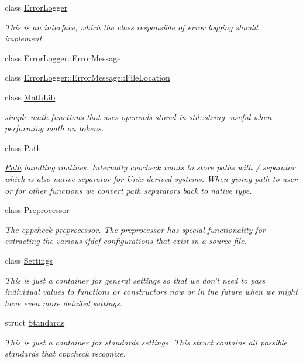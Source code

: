 \begin{DoxyCompactItemize}
class \hyperlink{class_error_logger}{Error\-Logger}
\begin{DoxyCompactList}\small\item\em This is an interface, which the class responsible of error logging should implement. \end{DoxyCompactList}\item 
class \hyperlink{class_error_logger_1_1_error_message}{Error\-Logger\-::\-Error\-Message}
\item 
class \hyperlink{class_error_logger_1_1_error_message_1_1_file_location}{Error\-Logger\-::\-Error\-Message\-::\-File\-Location}
\item 
class \hyperlink{class_math_lib}{Math\-Lib}
\begin{DoxyCompactList}\small\item\em simple math functions that uses operands stored in std\-::string. useful when performing math on tokens. \end{DoxyCompactList}\item 
class \hyperlink{class_path}{Path}
\begin{DoxyCompactList}\small\item\em \hyperlink{class_path}{Path} handling routines. Internally cppcheck wants to store paths with / separator which is also native separator for Unix-\/derived systems. When giving path to user or for other functions we convert path separators back to native type. \end{DoxyCompactList}\item 
class \hyperlink{class_preprocessor}{Preprocessor}
\begin{DoxyCompactList}\small\item\em The cppcheck preprocessor. The preprocessor has special functionality for extracting the various ifdef configurations that exist in a source file. \end{DoxyCompactList}\item 
class \hyperlink{class_settings}{Settings}
\begin{DoxyCompactList}\small\item\em This is just a container for general settings so that we don't need to pass individual values to functions or constructors now or in the future when we might have even more detailed settings. \end{DoxyCompactList}\item 
struct \hyperlink{struct_standards}{Standards}
\begin{DoxyCompactList}\small\item\em This is just a container for standards settings. This struct contains all possible standards that cppcheck recognize. \end{DoxyCompactList}\item 

\end{DoxyCompactItemize}
